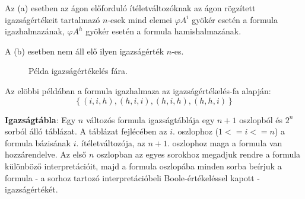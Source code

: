 \documentclass[tikz,12pt,margin=0px]{article}
\begin{document}
    \noindent Az (a) esetben az ágon előforduló ítéletváltozóknak az ágon rögzített igazságértékeit tartalmazó $n$-esek mind elemei $\varphi A^{i}$	gyökér esetén a formula igazhalmazának, $\varphi A^{h}$ gyökér esetén a formula hamishalmazának.
	
	\noindent A (b) esetben nem áll elő ilyen igazságérték $n$-es.
	
	\begin{figure}[H]
		\centering
		\caption{Példa igazságértékelés fára.}
		\label{fig:szerkfa}
	\end{figure}
	
	\noindent Az elöbbi példában a formula igazhalmaza az igazságértékelés-fa alapján:
    \[
        \left\{(i,i,h),(h,i,i),(h,i,h),(h,h,i)\right\}
    \]
	
	\noindent \textbf{Igazságtábla}: Egy $n$ változós formula igazságtáblája egy $n+1$ oszlopból és $2^{n}$ sorból álló táblázat.
	A táblázat fejlécében az $i$. oszlophoz ($1<=i<=n$) a formula bázisának $i$. ítéletváltozója, az $n+1$. oszlophoz maga a formula
	van hozzárendelve. Az első $n$ oszlopban az egyes sorokhoz megadjuk rendre a formula különböző interpretációit, majd a formula
	oszlopába minden sorba beírjuk a formula - a sorhoz tartozó interpretációbeli Boole-értékeléssel kapott - igazságértékét.\\
	
\end{document}
